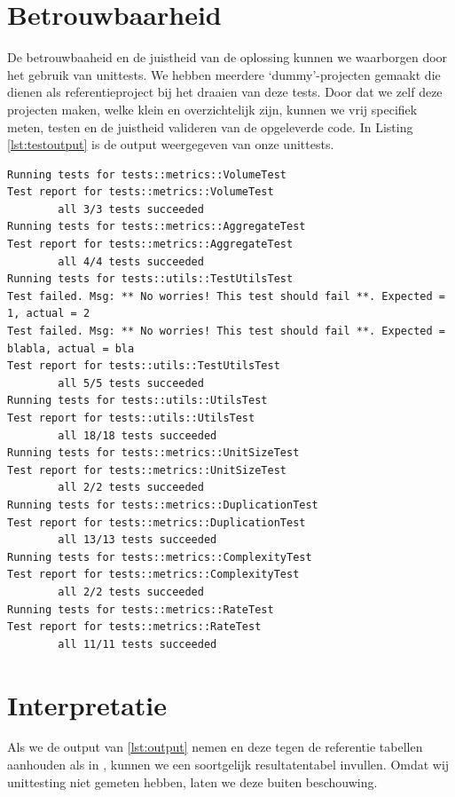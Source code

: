 \documentclass[a4paper]{article}
\begin{document}
\section{Betrouwbaarheid}
De betrouwbaaheid en de juistheid van de oplossing kunnen we waarborgen door het gebruik van unittests. 
We hebben meerdere `dummy'-projecten gemaakt die dienen als referentieproject bij het draaien van deze tests. 
Door dat we zelf deze projecten maken, welke klein en overzichtelijk zijn, kunnen we vrij specifiek meten, testen en de juistheid valideren van de opgeleverde code. In Listing \ref{lst:testoutput} is de output weergegeven van onze unittests.
\begin{lstlisting}[caption={Unit test output},label={lst:testoutput},frame = single]
Running tests for tests::metrics::VolumeTest
Test report for tests::metrics::VolumeTest                                                
        all 3/3 tests succeeded
Running tests for tests::metrics::AggregateTest
Test report for tests::metrics::AggregateTest                                             
        all 4/4 tests succeeded
Running tests for tests::utils::TestUtilsTest
Test failed. Msg: ** No worries! This test should fail **. Expected = 1, actual = 2       
Test failed. Msg: ** No worries! This test should fail **. Expected = blabla, actual = bla
Test report for tests::utils::TestUtilsTest                                 
        all 5/5 tests succeeded
Running tests for tests::utils::UtilsTest
Test report for tests::utils::UtilsTest                                                     
        all 18/18 tests succeeded
Running tests for tests::metrics::UnitSizeTest
Test report for tests::metrics::UnitSizeTest                                              
        all 2/2 tests succeeded
Running tests for tests::metrics::DuplicationTest
Test report for tests::metrics::DuplicationTest                                             
        all 13/13 tests succeeded
Running tests for tests::metrics::ComplexityTest
Test report for tests::metrics::ComplexityTest                                            
        all 2/2 tests succeeded
Running tests for tests::metrics::RateTest
Test report for tests::metrics::RateTest                                                    
        all 11/11 tests succeeded
\end{lstlisting}
\section{Interpretatie}
Als we de output van \ref{lst:output} nemen en deze tegen de referentie tabellen aanhouden als in \cite{A}, kunnen we een soortgelijk resultatentabel invullen. Omdat wij unittesting niet gemeten hebben, laten we deze buiten beschouwing.
\end{document}
